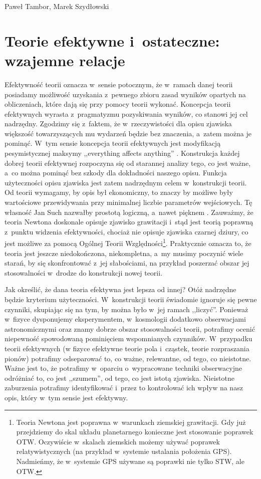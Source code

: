 \begin{artplenv2auth}{Paweł Tambor, Marek Szydłowski}
\section{Teorie efektywne i~ostateczne: wzajemne relacje}
Efektywność teorii oznacza w~sensie potocznym, że w~ramach danej teorii posiadamy możliwość uzyskania z~pewnego zbioru zasad wyników opartych na obliczeniach, które dają się przy pomocy teorii wykonać. Koncepcja teorii efektywnych wyrasta z~pragmatyzmu pozyskiwania wyników, co stanowi jej cel nadrzędny. Zgodzimy się z~faktem, że w~rzeczywistości dla opisu zjawiska większość towarzyszących mu wydarzeń będzie bez znaczenia, a~zatem można je pominąć. W~tym sensie koncepcja teorii efektywnych jest modyfikacją pesymistycznej maksymy ,,everything affects anything''
\parencite[][s.~1]{wells_effective_2012}. %
 Konstrukcja każdej dobrej teorii efektywnej rozpoczyna się od starannej analizy tego, co jest ważne, a~co można pominąć bez szkody dla dokładności naszego opisu. Funkcja użyteczności opisu zjawiska jest zatem nadrzędnym celem w~konstrukcji teorii. Od teorii wymagamy, by opis był ekonomiczny, to znaczy by możliwe były wartościowe przewidywania przy minimalnej liczbie parametrów wejściowych. Tę własność Jan Such nazwałby prostotą logiczną, a~nawet pięknem 
\parencites[por.][s.~45]{such_czy_1975}[zob. także][s.~45]{such_na_2014}. %
 Zauważmy, że teoria Newtona doskonale opisuje zjawisko grawitacji i~stąd jest teorią poprawną z~punktu widzenia efektywności, chociaż nie opisuje zjawiska czarnej dziury, co jest możliwe za pomocą Ogólnej Teorii Względności\footnote{Teoria Newtona jest poprawna w~warunkach ziemskiej grawitacji. Gdy już przejdziemy do skal układu planetarnego konieczne jest stosowanie poprawek OTW. Oczywiście w~skalach ziemskich możemy używać poprawek relatywistycznych (na przykład w~systemie ustalania położenia GPS). Nadmieńmy, że w~systemie GPS używane są poprawki nie tylko STW, ale OTW.}. Praktycznie oznacza to, że teoria jest jeszcze niedokończona, niekompletna, a~my musimy poczynić wiele starań, by się skonfrontować z~jej słabościami, na przykład poszerzać obszar jej stosowalności w~drodze do konstrukcji nowej teorii.

Jak określić, że dana teoria efektywna jest lepsza od innej? Otóż nadrzędne będzie kryterium użyteczności. W~konstrukcji teorii świadomie ignoruje się pewne czynniki, skupiając się na tym, by można było w~jej ramach ,,liczyć''. Ponieważ w~fizyce dysponujemy eksperymentem, w~kosmologii dodatkowo obserwacjami astronomicznymi oraz znamy dobrze obszar stosowalności teorii, potrafimy ocenić niepewność spowodowaną pominięciem wspomnianych czynników. W~przypadku teorii efektywnych (w fizyce efektywne teorie pola i~cząstek, teorie rozpraszania pionów) potrafimy odseparować to, co ważne, relewantne, od tego, co nieistotne. Ważne jest to, że potrafimy w~oparciu o~wypracowane techniki obserwacyjne odróżniać to, co jest ,,szumem'', od tego, co jest istotą zjawiska. Nieistotne zaburzenia potrafimy identyfikować i~przez to kontrolować ich wpływ na nasz opis, który w~tym sensie jest efektywny.


\end{artplenv2auth}

